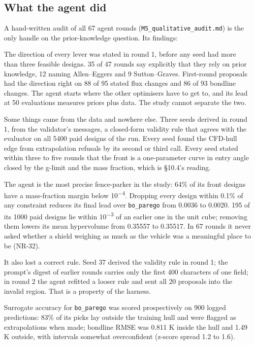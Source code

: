 \documentclass[
  a4paper,
  11pt]{article}
\begin{document}
\subsection{What the agent did}

A hand-written audit of all 67 agent rounds
(\texttt{M5\_\allowbreak{}qualitative\_\allowbreak{}audit.md}) is the
only handle on the prior-knowledge question. Its findings:

The direction of every lever was stated in round 1, before any seed had
more than three feasible designs. 35 of 47 rounds say explicitly that
they rely on prior knowledge, 12 naming Allen--Eggers and 9
Sutton--Graves. First-round proposals had the direction right on 88 of
95 stated flux changes and 86 of 93 bondline changes. The agent starts
where the other optimisers have to get to, and its lead at 50
evaluations measures priors plus data. The study cannot separate the
two.

Some things came from the data and nowhere else. Three seeds derived in
round 1, from the validator's messages, a closed-form validity rule that
agrees with the evaluator on all 5400 paid designs of the run. Every
seed found the CFD-hull edge from extrapolation refusals by its second
or third call. Every seed stated within three to five rounds that the
front is a one-parameter curve in entry angle closed by the g-limit and
the mass fraction, which is §10.4's reading.

The agent is the most precise fence-parker in the study: 64\% of its
front designs have a mass-fraction margin below 10\textsuperscript{−4}.
Dropping every design within 0.1\% of any constraint reduces its final
lead over \texttt{bo\_\allowbreak{}parego} from 0.0036 to 0.0020. 195 of
its 1000 paid designs lie within 10\textsuperscript{−3} of an earlier
one in the unit cube; removing them lowers its mean hypervolume from
0.35557 to 0.35517. In 67 rounds it never asked whether a shield
weighing as much as the vehicle was a meaningful place to be (NR-32).

It also lost a correct rule. Seed 37 derived the validity rule in round
1; the prompt's digest of earlier rounds carries only the first 400
characters of one field; in round 2 the agent refitted a looser rule and
sent all 20 proposals into the invalid region. That is a property of the
harness.

Surrogate accuracy for \texttt{bo\_\allowbreak{}parego} was scored
prospectively on 900 logged predictions: 83\% of its picks lay outside
the training hull and were flagged as extrapolations when made; bondline
RMSE was 0.811 K inside the hull and 1.49 K outside, with intervals
somewhat overconfident (z-score spread 1.2 to 1.6).
\end{document}
